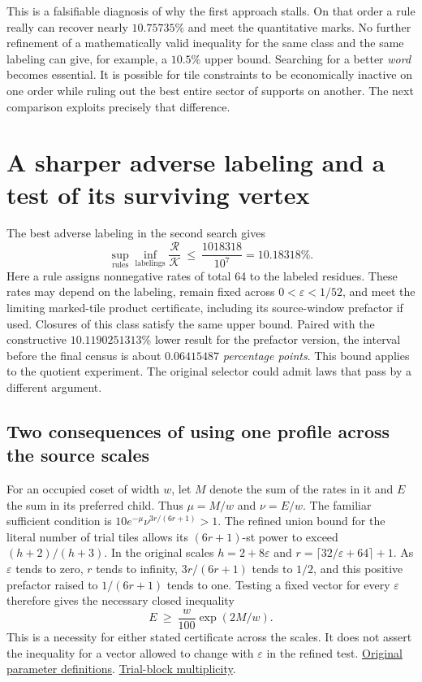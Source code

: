 \documentclass[12pt,letterpaper]{article}
\begin{document}
This is a falsifiable diagnosis of why the first approach stalls. On that order a rule really can recover nearly \(10.75735\%\) and meet the quantitative marks. No further refinement of a mathematically valid inequality for the same class and the same labeling can give, for example, a \(10.5\%\) upper bound. Searching for a better \emph{word} becomes essential. It is possible for tile constraints to be economically inactive on one order while ruling out the best entire sector of supports on another. The next comparison exploits precisely that difference.
\section{A sharper adverse labeling and a test of its surviving vertex}
\label{sec:rootmark}

The best adverse labeling in the second search gives
\[
 \sup_{\text{rules}}\inf_{\text{labelings}}
 \frac{\mathcal R}{\mathcal K}
 \ \le\ \frac{1018318}{10^7}=10.18318\%.
\]
Here a rule assigns nonnegative rates of total 64 to the labeled residues. These rates may depend on the labeling, remain fixed across \(0<\varepsilon<1/52\), and meet the limiting marked-tile product certificate, including its source-window prefactor if used. Closures of this class satisfy the same upper bound. Paired with the constructive \(10.1190251313\%\) lower result for the prefactor version, the interval before the final census is about \(0.06415487\) \emph{percentage points}. This bound applies to the quotient experiment. The original selector could admit laws that pass by a different argument.

\subsection{Two consequences of using one profile across the source scales}

For an occupied coset of width \(w\), let \(M\) denote the sum of the rates in it and \(E\) the sum in its preferred child. Thus \(\mu=M/w\) and \(\nu=E/w\). The familiar sufficient condition is
\(10e^{-\mu}\nu^{3r/(6r+1)}>1\).
The refined union bound for the literal number of trial tiles allows its \((6r+1)\)-st power to exceed \((h+2)/(h+3)\). In the original scales \(h=2+8\varepsilon\) and \(r=\lceil32/\varepsilon+64\rceil+1\). As \(\varepsilon\) tends to zero, \(r\) tends to infinity, \(3r/(6r+1)\) tends to \(1/2\), and this positive prefactor raised to \(1/(6r+1)\) tends to one. Testing a fixed vector for every \(\varepsilon\) therefore gives the necessary closed inequality
\[
 E\ \ge\ \frac{w}{100}\exp(2M/w).
 \tag{R1}
\]
This is a necessity for either stated certificate across the scales. It does not assert the inequality for a vector allowed to change with \(\varepsilon\) in the refined test.
\href{https://github.com/nousentllc/riemann-hypothesis/blob/40e56bab026552e089d7afcfeff08d2defb9c005/src/Development/AutomorphicArithmetic/ThickFrames/MarkedLow.lean#L20-L31}{Original parameter definitions}.
\href{https://github.com/nousentllc/riemann-hypothesis/blob/40e56bab026552e089d7afcfeff08d2defb9c005/src/Formalism/SharpRestriction/GrowthBounds/UnramifiedQuadraticSetting.lean#L237-L251}{Trial-block multiplicity}.
\end{document}
